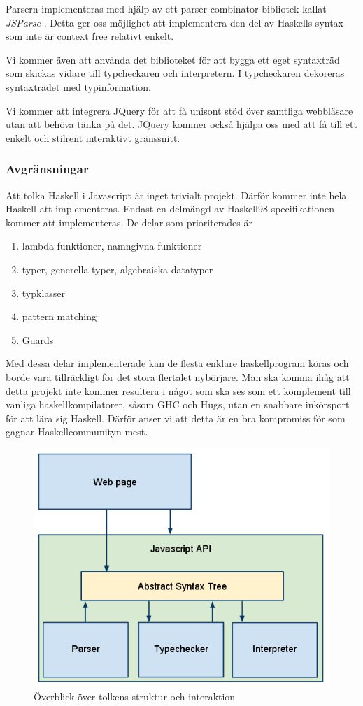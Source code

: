  Parsern implementeras med hjälp av ett parser combinator bibliotek kallat \emph{JSParse} \citep{jsparse}. Detta ger oss möjlighet att implementera den del av Haskells syntax som inte är context free relativt enkelt.

Vi kommer även att använda det biblioteket för att bygga ett eget syntaxträd som skickas vidare till typcheckaren och interpretern. I typcheckaren dekoreras syntaxträdet med typinformation.

Vi kommer att integrera JQuery \citep{jquery} för att få unisont stöd över samtliga webbläsare utan att behöva tänka på det. JQuery kommer också hjälpa oss med att få till ett enkelt och stilrent interaktivt gränssnitt.

\subsubsection{Avgränsningar}
Att tolka Haskell i Javascript är inget trivialt projekt. Därför kommer inte hela Haskell att implementeras. 
Endast en delmängd av Haskell98 specifikationen kommer att implementeras. De delar som prioriterades är
        \begin{enumerate}
            \item{lambda-funktioner, namngivna funktioner}
            \item{typer, generella typer, algebraiska datatyper}
            \item{typklasser}
            \item{pattern matching}
            \item{Guards}
            \end{enumerate}
Med dessa delar implementerade kan de flesta enklare haskellprogram köras och borde vara tillräckligt för det stora flertalet nybörjare. Man ska komma ihåg att detta projekt inte kommer resultera i något som ska ses som ett komplement till vanliga haskellkompilatorer, såsom GHC och Hugs, utan en snabbare inkörsport för att lära sig Haskell. Därför anser vi att detta är en bra kompromiss för som gagnar Haskellcommunityn mest. %

\begin{figure}
    \begin{center}
        \includegraphics[width=1.0\textwidth]{image1.png}
        \caption{Överblick över tolkens struktur och interaktion}
    \end{center}
\end{figure}
